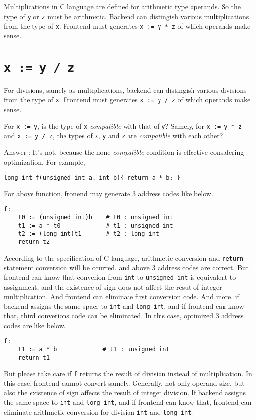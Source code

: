 Multiplications in C language are defined for arithmetic type operands.
So the type of {\tt{y}} or {\tt{z}} must be arithmetic.
Backend can distingish various multiplications from the type of {\tt{x}}.
Frontend must generates {\tt{x := y * z}} of which operands make sense.

\section{{\tt{x := y / z}}}

For divisions, samely as multiplications,
backend can distingish various divisions from the type of {\tt{x}}.
Frontend must generates {\tt{x := y / z}} of which operands make sense.

\begin{QandA}
For {\tt{x := y}}, is the type of {\tt{x}} {\it compatible}
with that of {\tt{y}}?  Samely, for 
{\tt{x := y * z}} and {\tt{x := y / z}},
the types of {\tt{x}}, {\tt{y}} and {\tt{z}} are
{\it compatible} with each other?

Answer : It's not, because the none-{\it compatible} condition
is effective considering optimization. For example,
\begin{verbatim}
long int f(unsigned int a, int b){ return a * b; }
\end{verbatim}
For above function, fronend may generate 3 address codes
like below.
\begin{verbatim}
f:
    t0 := (unsigned int)b    # t0 : unsigned int
    t1 := a * t0             # t1 : unsigned int
    t2 := (long int)t1       # t2 : long int
    return t2
\end{verbatim}
According to the specification of C language,
arithmetic conversion and {\tt{return}} statement conversion
will be ocurred, and above 3 address codes are correct.
But frontend can know that converion from {\tt{int}} to {\tt{unsigned int}}
is equivalent to assignment, and the existence of sign
does not affect the resut of integer multiplication.
And frontend can eliminate first conversion code.
And more, if backend assigns the same space
to {\tt {int}} and {\tt {long int}}, and if frontend can know
that, third converions code can be eliminated.
In this case, optimized 3 address codes are like below.
\begin{verbatim}
f:
    t1 := a * b             # t1 : unsigned int
    return t1
\end{verbatim}
But please take care if {\tt{f}} returns the result of division
instead of multiplication. In this case, frontend cannot convert
samely. Generally, not only operand size, but
also the existence of sign affects the result of integer
division. If backend assigns the same space
to {\tt {int}} and {\tt {long int}}, and if frontend can know
that, frontend can eliminate arithmetic conversion
for division {\tt {int}} and {\tt {long int}}.
\end{QandA}

